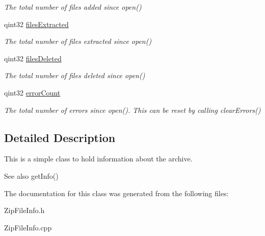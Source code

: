 \begin{DoxyCompactItemize}
\begin{DoxyCompactList}\small\item\em The total number of files added since open() \end{DoxyCompactList}\item 
qint32 \hyperlink{class_zip_info_a26793c869f83a14c05850d9be9bb48ef}{files\+Extracted}\hypertarget{class_zip_info_a26793c869f83a14c05850d9be9bb48ef}{}\label{class_zip_info_a26793c869f83a14c05850d9be9bb48ef}

\begin{DoxyCompactList}\small\item\em The total number of files extracted since open() \end{DoxyCompactList}\item 
qint32 \hyperlink{class_zip_info_ad3c3cbd1c11a0810a0cd32782cd209c3}{files\+Deleted}\hypertarget{class_zip_info_ad3c3cbd1c11a0810a0cd32782cd209c3}{}\label{class_zip_info_ad3c3cbd1c11a0810a0cd32782cd209c3}

\begin{DoxyCompactList}\small\item\em The total number of files deleted since open() \end{DoxyCompactList}\item 
qint32 \hyperlink{class_zip_info_ab3badeee755c830e71527a28e1f4add9}{error\+Count}\hypertarget{class_zip_info_ab3badeee755c830e71527a28e1f4add9}{}\label{class_zip_info_ab3badeee755c830e71527a28e1f4add9}

\begin{DoxyCompactList}\small\item\em The total number of errors since open(). This can be reset by calling clear\+Errors() \end{DoxyCompactList}\end{DoxyCompactItemize}


\subsection{Detailed Description}
This is a simple class to hold information about the archive. 

\begin{DoxySeeAlso}{See also}
get\+Info() 
\end{DoxySeeAlso}


The documentation for this class was generated from the following files\+:\begin{DoxyCompactItemize}
\item 
Zip\+File\+Info.\+h\item 
Zip\+File\+Info.\+cpp\end{DoxyCompactItemize}
